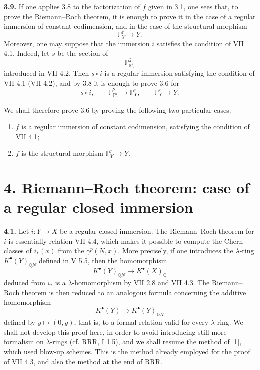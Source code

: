 \documentclass[11pt]{article}
\newcommand{\RRR}{\mathrm{RRR}}
\begin{document}
\textbf{3.9.} If one applies 3.8 to the factorization of \(f\) given in 3.1, one sees that, to prove the Riemann--Roch theorem, it is enough to prove it in the case of a regular immersion of constant codimension, and in the case of the structural morphism
\[
 \mathbb P^r_Y\longrightarrow Y .
\]
Moreover, one may suppose that the immersion \(i\) satisfies the condition of VII 4.1. Indeed, let \(s\) be the section of
\[
 \mathbb P^2_{\mathbb P^r_Y}
\]
introduced in VII 4.2. Then \(s\circ i\) is a regular immersion satisfying the condition of VII 4.1 (VII 4.2), and by 3.8 it is enough to prove 3.6 for
\[
s\circ i,\qquad
\mathbb P^2_{\mathbb P^r_Y}\longrightarrow\mathbb P^r_Y,\qquad
\mathbb P^r_Y\longrightarrow Y .
\]

We shall therefore prove 3.6 by proving the following two particular cases:
\begin{enumerate}[label=\roman*)]
\item \(f\) is a regular immersion of constant codimension, satisfying the condition of VII 4.1;
\item \(f\) is the structural morphism \(\mathbb P^r_Y\to Y\).
\end{enumerate}

\section*{4. Riemann--Roch theorem: case of a regular closed immersion}

\textbf{4.1.} Let \(i:Y\to X\) be a regular closed immersion. The Riemann--Roch theorem for \(i\) is essentially relation VII 4.4, which makes it possible to compute the Chern classes of \(i_*(x)\) from the \(\gamma^p(N,x)\). More precisely, if one introduces the \(\lambda\)-ring \(K^{\bullet}(Y)_{\mathbb Q N}\) defined in V 5.5, then the homomorphism
\[
K^{\bullet}(Y)_{\mathbb Q N}\longrightarrow K^{\bullet}(X)_{\mathbb Q}
\]
deduced from \(i_*\) is a \(\lambda\)-homomorphism by VII 2.8 and VII 4.3. The Riemann--Roch theorem is then reduced to an analogous formula concerning the additive homomorphism
\[
K^{\bullet}(Y)\longrightarrow K^{\bullet}(Y)_{\mathbb Q N}
\]
defined by \(y\mapsto(0,y)\), that is, to a formal relation valid for every \(\lambda\)-ring. We shall not develop this proof here, in order to avoid introducing still more formalism on \(\lambda\)-rings (cf. \(\RRR\), I 1.5), and we shall resume the method of [1], which used blow-up schemes. This is the method already employed for the proof of VII 4.3, and also the method at the end of \(\RRR\).
\end{document}
